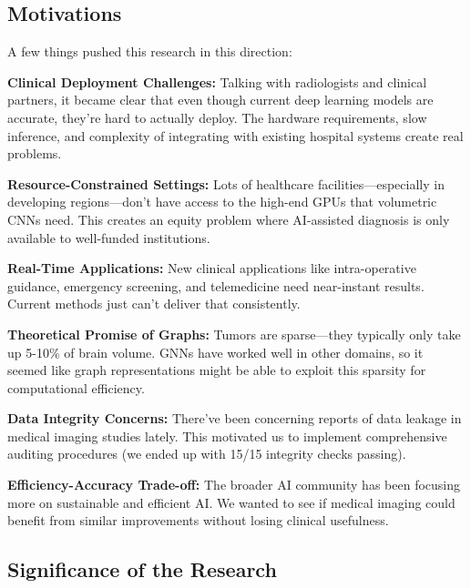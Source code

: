  
\subsection{Motivations}

A few things pushed this research in this direction:

\textbf{Clinical Deployment Challenges:} Talking with radiologists and clinical partners, it became clear that even though current deep learning models are accurate, they're hard to actually deploy. The hardware requirements, slow inference, and complexity of integrating with existing hospital systems create real problems.

\textbf{Resource-Constrained Settings:} Lots of healthcare facilities—especially in developing regions—don't have access to the high-end GPUs that volumetric CNNs need. This creates an equity problem where AI-assisted diagnosis is only available to well-funded institutions.

\textbf{Real-Time Applications:} New clinical applications like intra-operative guidance, emergency screening, and telemedicine need near-instant results. Current methods just can't deliver that consistently.

\textbf{Theoretical Promise of Graphs:} Tumors are sparse—they typically only take up 5-10\% of brain volume. GNNs have worked well in other domains, so it seemed like graph representations might be able to exploit this sparsity for computational efficiency.

\textbf{Data Integrity Concerns:} There've been concerning reports of data leakage in medical imaging studies lately. This motivated us to implement comprehensive auditing procedures (we ended up with 15/15 integrity checks passing).

\textbf{Efficiency-Accuracy Trade-off:} The broader AI community has been focusing more on sustainable and efficient AI. We wanted to see if medical imaging could benefit from similar improvements without losing clinical usefulness.


\subsection{Significance of the Research}

